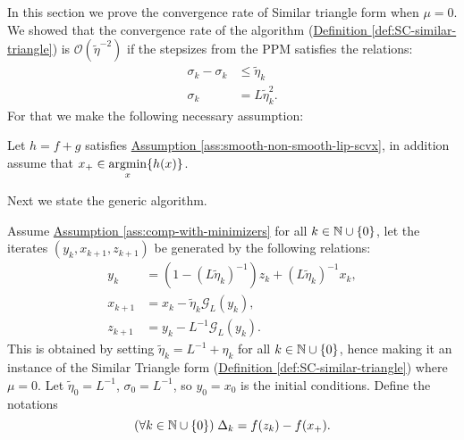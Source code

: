 \documentclass[12pt]{article}
\begin{document}
    In this section we prove the convergence rate of Similar triangle form when $\mu = 0$. 
    We showed that the convergence rate of the algorithm 
    (\hyperref[def:SC-similar-triangle]{Definition \ref*{def:SC-similar-triangle}})
    is $\mathcal O(\tilde \eta ^{-2})$ if the stepsizes from the PPM satisfies the relations: 
    \begin{align*}
        \sigma_{k} - \sigma_{k} &\le \tilde\eta_k
        \\
        \sigma_k &= L \tilde \eta_k^2. 
    \end{align*}
    For that we make the following necessary assumption: 
    \begin{assumption}\label{ass:comp-with-minimizers}
        Let $h = f + g$ satisfies 
        \hyperref[ass:smooth-non-smooth-lip-scvx]
        {Assumption \ref*{ass:smooth-non-smooth-lip-scvx}}, 
        in addition assume that $x_+ \in \mathop{\rm argmin}\limits_x \{h(x)\}$. 
    \end{assumption}
    Next we state the generic algorithm. 
    \begin{definition}
        \label{def:similar-triangle-to-prove}
        Assume
        \hyperref[ass:comp-with-minimizers]
        {Assumption \ref*{ass:comp-with-minimizers}}
        for all $k\in \mathbb N \cup \{0\}$, let the iterates $(y_k, x_{k + 1}, z_{k +1})$ be generated by the following relations: 
        \begin{align}
            y_k &= (1 - (L\tilde \eta_k)^{-1}) z_k + (L\tilde \eta_k)^{-1} x_k, 
            \\
            x_{k + 1} &= x_k - \tilde \eta_k \mathcal G_L(y_k), 
            \\
            z_{k + 1} &= y_k - L^{-1} \mathcal G_L(y_k). 
            \label{eqn:similar-triangle-to-prove}
        \end{align}
        This is obtained by setting $\tilde \eta_k = L^{-1} + \eta_k$ for all $k \in \mathbb N\cup \{0\}$, hence making it an instance of the Similar Triangle form 
        (\hyperref[def:SC-similar-triangle]
            {Definition \ref*{def:SC-similar-triangle}}) 
        where $\mu =0$. 
        Let $\tilde \eta_0 = L^{-1}$, $\sigma_0 = L^{-1}$, so $y_0 = x_0$ is the initial conditions. 
        Define the notations 
        $$
            (\forall k \in \mathbb N \cup \{0\})\; \Delta_k = f(z_k) - f(x_+). 
        $$
    \end{definition}
    
\end{document}
